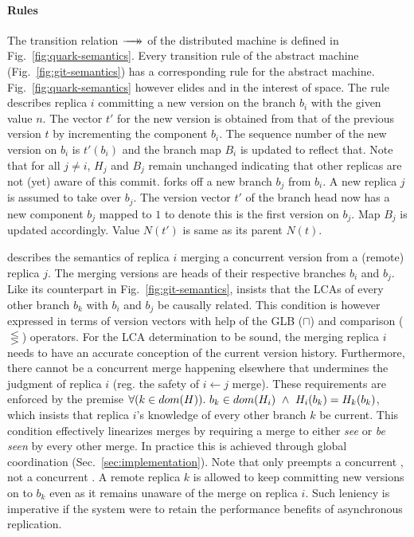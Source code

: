 \paragraph{Rules} The transition relation $\xrightarrow[]{\quad}\mathrel{\mkern-14mu}\rightarrow$ of the \quark
distributed machine is defined in Fig.~\ref{fig:quark-semantics}.
Every transition rule of the abstract machine
(Fig.~\ref{fig:git-semantics}) has a corresponding rule for the
abstract machine. Fig.~\ref{fig:quark-semantics} however elides
 and  in the interest of space.
The rule  describes replica $i$ committing a new
version on the branch $b_i$ with the given value $n$.  The vector $t'$
for the new version is obtained from that of the previous version $t$
by incrementing the component $b_i$. The sequence number of the new
version on $b_i$ is $t'(b_i)$ and the branch map $B_i$ is updated to
reflect that. Note that for all $j \neq i$, $H_j$ and $B_j$ remain
unchanged indicating that other replicas are not (yet) aware of this
commit.
%
 forks off a new branch $b_j$ from $b_i$. A new
replica $j$ is assumed to take over $b_j$. The version vector $t'$ of
the branch head now has a new component $b_j$ mapped to $1$ to denote
this is the first version on $b_j$. Map $B_j$ is updated accordingly.
Value $N(t')$ is same as its parent $N(t)$.

 describes the semantics of replica $i$ merging a
concurrent version from a (remote) replica $j$. The merging versions
are heads of their respective branches $b_i$ and $b_j$.  Like its
counterpart in Fig.~\ref{fig:git-semantics},  insists
that the LCAs of every other branch $b_k$ with $b_i$ and $b_j$ be
causally related. This condition is however expressed in terms of
version vectors with help of the GLB ($\sqcap$) and comparison
($\lesseqgtr$) operators. For the LCA determination to be sound,
the merging replica $i$ needs to have an accurate conception of the
current version history. Furthermore, there cannot be a concurrent
merge happening elsewhere that undermines the judgment of replica $i$
(reg. the safety of $i \leftarrow j$ merge). These requirements are
enforced by the premise $\forall (k\in dom(H)).~b_k \in dom(H_i) ~\wedge~
H_i(b_k) = H_k(b_k)$, which insists that replica $i$'s knowledge of
every other branch $k$ be current. This condition effectively
linearizes merges by requiring a merge to either \emph{see} or
\emph{be seen} by every other merge. In practice this is achieved
through global coordination (Sec.~\ref{sec:implementation}). Note that
 only preempts a concurrent , not a
concurrent . A remote replica $k$ is allowed to keep
committing new versions on to $b_k$ even as it remains unaware of the
merge on replica $i$. Such leniency is imperative if the system were
to retain the performance benefits of asynchronous replication.

